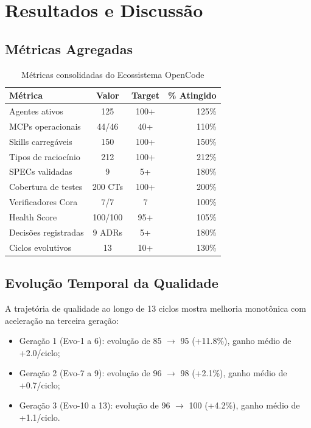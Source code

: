 \documentclass[12pt,a4paper,sumario=tradicional]{abntex2}
\begin{document}
\chapter{Resultados e Discussão}

\section{Métricas Agregadas}

\begin{table}[H]
\centering
\caption{Métricas consolidadas do Ecossistema OpenCode}
\label{tab:metrics-full}
\begin{tabular}{@{}lccr@{}}
\toprule
\textbf{Métrica} & \textbf{Valor} & \textbf{Target} & \textbf{\% Atingido} \\
\midrule
Agentes ativos & 125 & 100+ & 125\% \\
MCPs operacionais & 44/46 & 40+ & 110\% \\
Skills carregáveis & 150 & 100+ & 150\% \\
Tipos de raciocínio & 212 & 100+ & 212\% \\
SPECs validadas & 9 & 5+ & 180\% \\
Cobertura de testes & 200 CTs & 100+ & 200\% \\
Verificadores Cora & 7/7 & 7 & 100\% \\
Health Score & 100/100 & 95+ & 105\% \\
Decisões registradas & 9 ADRs & 5+ & 180\% \\
Ciclos evolutivos & 13 & 10+ & 130\% \\
\bottomrule
\end{tabular}
\end{table}

\section{Evolução Temporal da Qualidade}

A trajetória de qualidade ao longo de 13 ciclos mostra melhoria monotônica com aceleração na terceira geração:

\begin{itemize}
    \item Geração 1 (Evo-1 a 6): evolução de 85 $\rightarrow$ 95 (+11.8\%), ganho médio de +2.0/ciclo;
    \item Geração 2 (Evo-7 a 9): evolução de 96 $\rightarrow$ 98 (+2.1\%), ganho médio de +0.7/ciclo;
    \item Geração 3 (Evo-10 a 13): evolução de 96 $\rightarrow$ 100 (+4.2\%), ganho médio de +1.1/ciclo.
\end{itemize}
\end{document}
